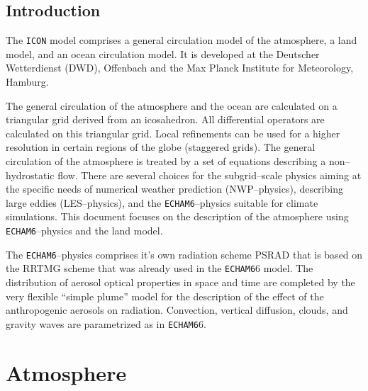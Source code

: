 \documentclass[DIV14,BCOR1cm,11pt,a4paper,twoside]{scrreprt}
\newcommand{\echam}{\color{black}\texttt{ECHAM6}\color{black}}
\newcommand{\icon}{\color{black}\texttt{ICON}\color{black}}
\begin{document}
\cleardoublepage

\chapter{Introduction}

The \icon{} model comprises a general circulation model of the
atmosphere, a land model, and an ocean circulation model. It is
developed at the Deutscher Wetterdienst (DWD), Offenbach and the Max Planck
Institute for Meteorology, Hamburg. 

The general circulation of the atmosphere and the ocean are calculated
on a triangular grid derived from an icosahedron. All differential
operators are calculated on this triangular grid. Local refinements
can be used for a higher resolution in certain regions of the globe
(staggered grids). The general
circulation of the atmosphere is treated by a set of equations describing
a non--hydrostatic flow. There are several choices for the subgrid--scale  
physics aiming at the specific needs of numerical weather prediction
(NWP--physics), describing large eddies (LES--physics), and the
\echam--physics suitable for climate simulations. This document
focuses on the description of the atmosphere using \echam--physics and
the land model. 

The \echam--physics comprises it's own radiation scheme PSRAD that is
based on the RRTMG scheme that was already used in the \echam6
model. The distribution of aerosol optical properties in space and
time are completed by the very flexible ``simple plume'' model for the
description of the effect of the anthropogenic aerosols on
radiation. Convection, vertical diffusion, clouds, and gravity waves are
parametrized as in \echam6.


\part{Atmosphere}








%

%

%

%

%
\end{document}
